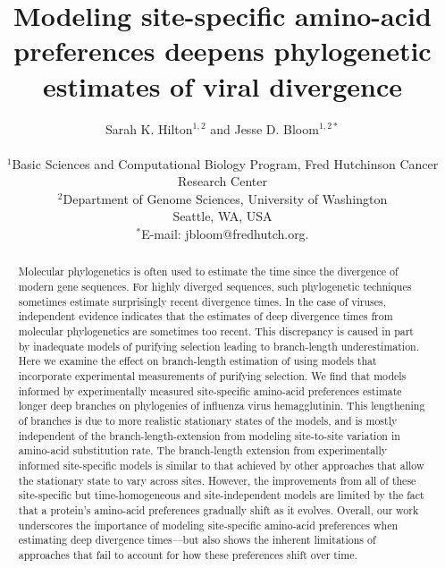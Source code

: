 \documentclass[11pt]{article}
\title{Modeling site-specific amino-acid preferences deepens phylogenetic estimates of viral divergence}
\author
{Sarah K. Hilton$^{1,2}$  and Jesse D. Bloom$^{1,2*}$\\
\\
\footnotesize{$^1$Basic Sciences and Computational Biology Program, Fred Hutchinson Cancer Research Center}\\
\footnotesize{$^2$Department of Genome Sciences, University of Washington}\\
\footnotesize{Seattle, WA, USA}\\
\footnotesize{$^*$E-mail:  jbloom@fredhutch.org.}\\
}
\date{}
\begin{document}
 


\maketitle 


\begin{abstract}
\noindent  
Molecular phylogenetics is often used to estimate the time since the divergence of modern gene sequences.
For highly diverged sequences, such phylogenetic techniques sometimes estimate surprisingly recent divergence times. 
In the case of viruses, independent evidence indicates that the estimates of deep divergence times from molecular phylogenetics are sometimes too recent.
This discrepancy is caused in part by inadequate models of purifying selection leading to branch-length underestimation.
Here we examine the effect on branch-length estimation of using models that incorporate experimental measurements of purifying selection.
We find that models informed by experimentally measured site-specific amino-acid preferences estimate longer deep branches on phylogenies of influenza virus hemagglutinin.
This lengthening of branches is due to more realistic stationary states of the models, and is mostly independent of the branch-length-extension from modeling site-to-site variation in amino-acid substitution rate.
The branch-length extension from experimentally informed site-specific models is similar to that achieved by other approaches that allow the stationary state to vary across sites.
However, the improvements from all of these site-specific but time-homogeneous and site-independent models are limited by the fact that a protein's amino-acid preferences gradually shift as it evolves.
Overall, our work underscores the importance of modeling site-specific amino-acid preferences when estimating deep divergence times---but also shows the inherent limitations of approaches that fail to account for how these preferences shift over time.
\end{abstract}

\clearpage
\end{document}
